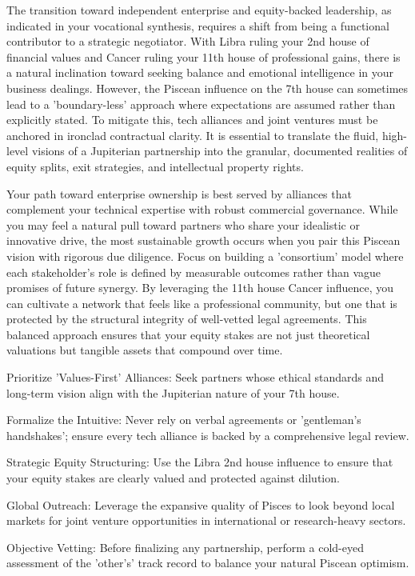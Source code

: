 {\fontsize{9}{13}\selectfont The transition toward independent enterprise and equity-backed leadership, as indicated in your vocational synthesis, requires a shift from being a functional contributor to a strategic negotiator. With Libra ruling your 2nd house of financial values and Cancer ruling your 11th house of professional gains, there is a natural inclination toward seeking balance and emotional intelligence in your business dealings. However, the Piscean influence on the 7th house can sometimes lead to a 'boundary-less' approach where expectations are assumed rather than explicitly stated. To mitigate this, tech alliances and joint ventures must be anchored in ironclad contractual clarity. It is essential to translate the fluid, high-level visions of a Jupiterian partnership into the granular, documented realities of equity splits, exit strategies, and intellectual property rights.}\par\vspace{1.8mm}

{\fontsize{9}{13}\selectfont Your path toward enterprise ownership is best served by alliances that complement your technical expertise with robust commercial governance. While you may feel a natural pull toward partners who share your idealistic or innovative drive, the most sustainable growth occurs when you pair this Piscean vision with rigorous due diligence. Focus on building a 'consortium' model where each stakeholder's role is defined by measurable outcomes rather than vague promises of future synergy. By leveraging the 11th house Cancer influence, you can cultivate a network that feels like a professional community, but one that is protected by the structural integrity of well-vetted legal agreements. This balanced approach ensures that your equity stakes are not just theoretical valuations but tangible assets that compound over time.}\par\vspace{1.8mm}

\begin{diamondlist}
  \item {\fontsize{8.5}{12}\selectfont Prioritize 'Values-First' Alliances: Seek partners whose ethical standards and long-term vision align with the Jupiterian nature of your 7th house.}
  \item {\fontsize{8.5}{12}\selectfont Formalize the Intuitive: Never rely on verbal agreements or 'gentleman's handshakes'; ensure every tech alliance is backed by a comprehensive legal review.}
  \item {\fontsize{8.5}{12}\selectfont Strategic Equity Structuring: Use the Libra 2nd house influence to ensure that your equity stakes are clearly valued and protected against dilution.}
  \item {\fontsize{8.5}{12}\selectfont Global Outreach: Leverage the expansive quality of Pisces to look beyond local markets for joint venture opportunities in international or research-heavy sectors.}
  \item {\fontsize{8.5}{12}\selectfont Objective Vetting: Before finalizing any partnership, perform a cold-eyed assessment of the 'other's' track record to balance your natural Piscean optimism.}
\end{diamondlist}

